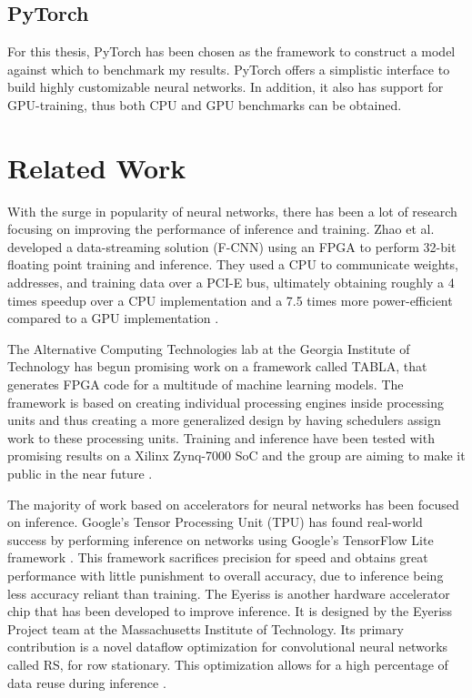 \subsection{PyTorch}
For this thesis, PyTorch has been chosen as the framework to construct a model against which to benchmark my results. PyTorch offers a simplistic interface to build highly customizable neural networks. In addition, it also has support for GPU-training, thus both CPU and GPU benchmarks can be obtained.

\section{Related Work}
With the surge in popularity of neural networks, there has been a lot of research focusing on improving the performance of inference and training. Zhao et al. developed a data-streaming solution (F-CNN) using an FPGA to perform 32-bit floating point training and inference. They used a CPU to communicate weights, addresses, and training data over a PCI-E bus, ultimately obtaining roughly a 4 times speedup over a CPU implementation and a 7.5 times more power-efficient compared to a GPU implementation \cite{FCNN}.

The Alternative Computing Technologies lab at the  Georgia Institute of Technology has begun promising work on a framework called TABLA, that generates FPGA code for a multitude of machine learning models. The framework is based on creating individual processing engines inside processing units and thus creating a more generalized design by having schedulers assign work to these processing units. Training and inference have been tested with promising results on a Xilinx Zynq-7000 SoC and the group are aiming to make it public in the near future \cite{TABLA}.

The majority of work based on accelerators for neural networks has been focused on inference. Google's Tensor Processing Unit (TPU) has found real-world success by performing inference on networks using Google's TensorFlow Lite framework \cite{TPU}. This framework sacrifices precision for speed and obtains great performance with little punishment to overall accuracy, due to inference being less accuracy reliant than training. The Eyeriss is another hardware accelerator chip that has been developed to improve inference. It is designed by the Eyeriss Project team at the Massachusetts Institute of Technology. Its primary contribution is a novel dataflow optimization for convolutional neural networks called RS, for row stationary. This optimization allows for a high percentage of data reuse during inference \cite{eyeriss}.

